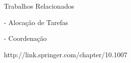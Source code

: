 
Trabalhos Relacionados

- Alocação de Tarefas



- Coordenação



http://link.springer.com/chapter/10.1007%
